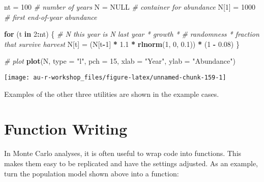 \documentclass[]{book}
\newenvironment{Shaded}{\begin{snugshade}}{\end{snugshade}}
\newcommand{\KeywordTok}[1]{\textcolor[rgb]{0.13,0.29,0.53}{\textbf{#1}}}
\newcommand{\DataTypeTok}[1]{\textcolor[rgb]{0.13,0.29,0.53}{#1}}
\newcommand{\DecValTok}[1]{\textcolor[rgb]{0.00,0.00,0.81}{#1}}
\newcommand{\FloatTok}[1]{\textcolor[rgb]{0.00,0.00,0.81}{#1}}
\newcommand{\StringTok}[1]{\textcolor[rgb]{0.31,0.60,0.02}{#1}}
\newcommand{\CommentTok}[1]{\textcolor[rgb]{0.56,0.35,0.01}{\textit{#1}}}
\newcommand{\OtherTok}[1]{\textcolor[rgb]{0.56,0.35,0.01}{#1}}
\newcommand{\ControlFlowTok}[1]{\textcolor[rgb]{0.13,0.29,0.53}{\textbf{#1}}}
\newcommand{\OperatorTok}[1]{\textcolor[rgb]{0.81,0.36,0.00}{\textbf{#1}}}
\newcommand{\NormalTok}[1]{#1}
\theoremstyle{definition}
\theoremstyle{definition}
\theoremstyle{definition}
\theoremstyle{remark}
\begin{document}
\begin{Shaded}
\begin{Highlighting}[]
\NormalTok{nt =}\StringTok{ }\DecValTok{100}       \CommentTok{# number of years}
\NormalTok{N =}\StringTok{ }\OtherTok{NULL}       \CommentTok{# container for abundance}
\NormalTok{N[}\DecValTok{1}\NormalTok{] =}\StringTok{ }\DecValTok{1000}    \CommentTok{# first end-of-year abundance}

\ControlFlowTok{for}\NormalTok{ (t }\ControlFlowTok{in} \DecValTok{2}\OperatorTok{:}\NormalTok{nt) \{}
  \CommentTok{# N this year is N last year * growth *}
    \CommentTok{# randomness * fraction that survive harvest}
\NormalTok{  N[t] =}\StringTok{ }\NormalTok{(N[t}\OperatorTok{-}\DecValTok{1}\NormalTok{] }\OperatorTok{*}\StringTok{ }\FloatTok{1.1} \OperatorTok{*}\StringTok{ }\KeywordTok{rlnorm}\NormalTok{(}\DecValTok{1}\NormalTok{, }\DecValTok{0}\NormalTok{, }\FloatTok{0.1}\NormalTok{)) }\OperatorTok{*}\StringTok{ }\NormalTok{(}\DecValTok{1} \OperatorTok{-}\StringTok{ }\FloatTok{0.08}\NormalTok{)}
\NormalTok{\}}

\CommentTok{# plot}
\KeywordTok{plot}\NormalTok{(N, }\DataTypeTok{type =} \StringTok{"l"}\NormalTok{, }\DataTypeTok{pch =} \DecValTok{15}\NormalTok{, }\DataTypeTok{xlab =} \StringTok{"Year"}\NormalTok{, }\DataTypeTok{ylab =} \StringTok{"Abundance"}\NormalTok{)}
\end{Highlighting}
\end{Shaded}

\begin{center}\texttt{[image: au-r-workshop\_files/figure-latex/unnamed-chunk-159-1]} \end{center}

Examples of the other three utilities are shown in the example cases.

\section{Function Writing}\label{adv-funcs}

In Monte Carlo analyses, it is often useful to wrap code into functions.
This makes them easy to be replicated and have the settings adjusted. As
an example, turn the population model shown above into a function:
\end{document}

